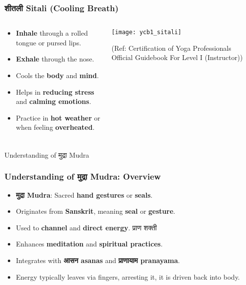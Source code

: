 \begin{frame}[fragile]\frametitle{शीतली Sitali (Cooling Breath)}
\begin{columns}
    \begin{column}[T]{0.5\linewidth}
      \begin{itemize}
        \item \textbf{Inhale} through a rolled tongue or pursed lips.
        \item \textbf{Exhale} through the nose.
        \item Cools the \textbf{body} and \textbf{mind}.
        \item Helps in \textbf{reducing stress} and \textbf{calming emotions}.
        \item Practice in \textbf{hot weather} or when feeling \textbf{overheated}.
      \end{itemize}
    \end{column}
    \begin{column}[T]{0.5\linewidth}
        \begin{center}
        \texttt{[image: ycb1\_sitali]}
				
		{\tiny (Ref: Certification  of Yoga Professionals Official Guidebook For Level I (Instructor))}	 
        \end{center}	
    \end{column}
\end{columns}
\end{frame}


\begin{frame}[fragile]\frametitle{}
\begin{center}
{\Large Understanding of मुद्रा  Mudra}
\end{center}
\end{frame}

\begin{frame}[fragile]\frametitle{Understanding of मुद्रा  Mudra: Overview}

      \begin{itemize}
        \item \textbf{मुद्रा  Mudra}: Sacred \textbf{hand gestures} or \textbf{seals}.
        \item Originates from \textbf{Sanskrit}, meaning \textbf{seal} or \textbf{gesture}.
        \item Used to \textbf{channel} and \textbf{direct energy}.  प्राण शक्ती 
        \item Enhances \textbf{meditation} and \textbf{spiritual practices}.
        \item Integrates with \textbf{आसन   asanas} and \textbf{प्राणायाम  pranayama}.
		\item Energy typically leaves via fingers, arresting it, it is driven back into body.
      \end{itemize}
\end{frame}

